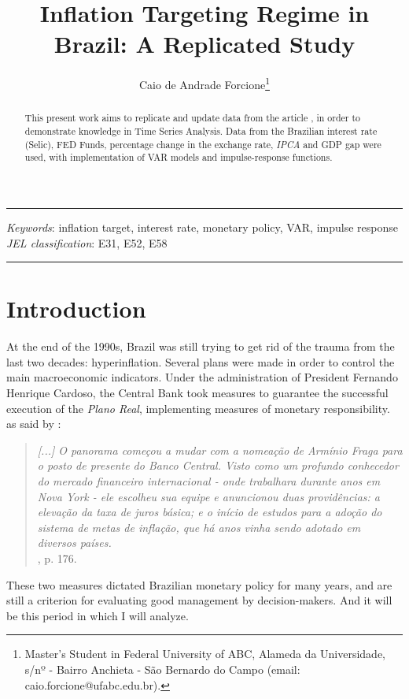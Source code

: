 \documentclass[hidelinks,12pt]{article}
\title{\textbf{Inflation Targeting Regime in Brazil: A Replicated Study}}
\author{Caio de Andrade Forcione\footnote{
		Master's Student in Federal University of ABC, Alameda da Universidade, s/nº - Bairro Anchieta - São Bernardo do Campo (email: caio.forcione@ufabc.edu.br). }}
\date{}
\begin{document}
	
	\maketitle
	
	\noindent\rule{17cm}{0.4pt}
	
	\begin{abstract}
	This present work aims to replicate and update data from the article \citet{c15}, in order to demonstrate knowledge in Time Series Analysis. Data from the Brazilian interest rate (Selic), FED Funds, percentage change in the exchange rate, \textit{IPCA} and GDP gap were used, 
	with implementation of VAR models and impulse-response functions.
	\end{abstract}
	\textit{Keywords}: inflation target, interest rate, monetary policy, VAR, impulse response \\
	\textit{JEL classification}: E31, E52, E58
	
	\noindent\rule{17cm}{0.4pt}
	

	
	\section{Introduction}



At the end of the 1990s, Brazil was still trying to get rid of the trauma from the last two decades: hyperinflation. Several plans were made in order to control the main macroeconomic indicators. Under the administration of President Fernando Henrique Cardoso, the Central Bank took measures to guarantee the successful execution of the \textit{Plano Real}, implementing measures of monetary responsibility. as said by \citet{g11}:

\begin{quote}
	\textit{[...] O panorama começou a mudar com a nomeação de Armínio Fraga para o posto de presente do Banco Central. Visto como um profundo conhecedor do mercado financeiro internacional - onde trabalhara durante anos em Nova York - ele escolheu sua equipe e anuncionou duas providências: a elevação da taxa de juros básica; e o início de estudos para a adoção do sistema de metas de inflação, que há anos vinha sendo adotado em diversos países.}\\
	\citet{g11}, p. 176.
\end{quote}

These two measures dictated Brazilian monetary policy for many years, and are still a criterion for evaluating good management by decision-makers. And it will be this period in which I will analyze.\\
\end{document}
